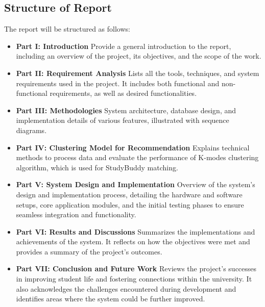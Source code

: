 \documentclass[12pt]{article}
\begin{document}
\subsection{Structure of Report}
The report will be structured as follows:
\begin{itemize}
    \item \textbf{Part I: Introduction }
    \newline
    Provide a general introduction to the report, including an overview of the project, its objectives, and the scope of the work.
    \item \textbf{Part II: Requirement Analysis }
    \newline
    Lists all the tools, techniques, and system requirements used in the project. It includes
    both functional and non-functional requirements, as well as desired functionalities.
    \item \textbf{Part III: Methodologies }
    \newline
    System architecture, database design, and implementation details of various features, illustrated with sequence diagrams.
    \item \textbf{Part IV: Clustering Model for Recommendation }
    \newline
    Explains technical methods to process data and evaluate the performance of K-modes clustering algorithm, which is used for StudyBuddy matching.
    \item \textbf{Part V: System Design and Implementation }
    \newline
    Overview of the system's design and implementation process, detailing the hardware and software setups, core application modules, and the initial testing phases to ensure seamless integration and functionality.
    \item \textbf{Part VI: Results and Discussions }
    \newline 
    Summarizes the implementations and achievements of the system. It reflects on how the
    objectives were met and provides a summary of the project's outcomes.
    \item \textbf{Part VII: Conclusion and Future Work }
    \newline
    Reviews the project's successes in improving student life and fostering connections within the university.
    It also acknowledges the challenges encountered during development and identifies areas where the system could be further improved.
\end{itemize}
\end{document}
